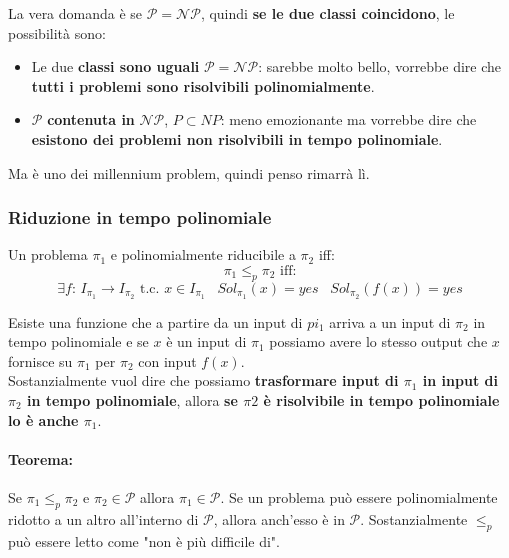 La vera domanda è se $\mathcal{P} = \mathcal{NP}$, quindi \textbf{se le due classi coincidono}, le possibilità sono: 
\begin{itemize}
	\item Le due \textbf{classi sono uguali} $\mathcal{P} = \mathcal{NP}$: sarebbe molto bello, vorrebbe dire che \textbf{tutti i problemi sono risolvibili polinomialmente}.\\
	
	\item $\mathcal{P}$ \textbf{contenuta in} $\mathcal{NP}$, $P \subset NP$: meno emozionante ma vorrebbe dire che \textbf{esistono dei problemi non risolvibili in tempo polinomiale}.\\
\end{itemize}

Ma è uno dei millennium problem, quindi penso rimarrà lì.\\

\subsubsection{Riduzione in tempo polinomiale}

Un problema $\pi_1$ e polinomialmente riducibile a $\pi_2$ iff: 
$$ \pi_1 \leq_p \pi_2 \text{ iff:}$$
$$ \exists f : \, I_{\pi_1} \rightarrow I_{\pi_2} \text{ t.c. } x \in I_{\pi_1} \;\;\; Sol_{\pi_1} (x) = yes \;\;\; Sol_{\pi_2} (f(x)) = yes $$ 

Esiste una funzione che a partire da un input di $pi_1$ arriva a un input di $\pi_2$ in tempo polinomiale e se $x$ è un input di $\pi_1$ possiamo avere lo stesso output che $x$ fornisce su $\pi_1$ per $\pi_2$ con input $f(x)$. \\

Sostanzialmente vuol dire che possiamo \textbf{trasformare input di $\pi_1$ in input di $\pi_2$ in tempo polinomiale}, allora \textbf{se $\pi 2$ è risolvibile in tempo polinomiale lo è anche $\pi_1$}.\\

\paragraph{Teorema:} Se $\pi_1 \leq_p \pi_2$ e $\pi_2 \in \mathcal{P}$ allora $\pi_1 \in \mathcal{P}$. Se un problema può essere polinomialmente ridotto a un altro all'interno di $\mathcal{P}$, allora anch'esso è in $\mathcal{P}$. Sostanzialmente $\leq_p$ può essere letto come "non è più difficile di".\\

